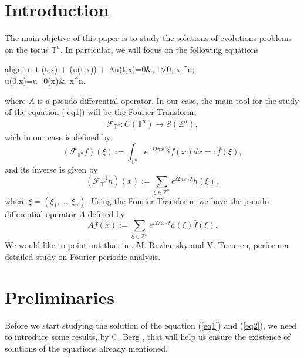 \documentclass[11pt]{article}
\begin{document}
	\section{Introduction}
	The main objetive of this paper is to study the solutions of evolutions problems on the torus $\mathbb{T}^n$. In particular, we will focus on the following equations
	\begin{empheq}[left = \empheqlbrace]{align}\label{eq1}
		u_t (t,x) + (u(t,x)) + Au(t,x)=0&, \hspace{11pt}t>0, \hspace{5pt}x \in {}^n;\\
		u(0,x)=u_0(x)&, \hspace{10pt}x\in {}^n.\notag
	\end{empheq}
where $A$ is a pseudo-differential operator. In our case, the main tool for the study of the equation (\ref{eq1}) will be the Fourier Transform,
\begin{align*}
	\mathcal{F}_{\mathbb{T}^n}:C(\mathbb{T}^n) \rightarrow \mathcal{S}(\mathbb{Z}^n),
\end{align*}
wich in our case is defined by
\begin{equation*}
	\left(\mathcal{F}_{\mathbb{T}^n} f\right)(\xi) := \int_{\mathbb{T}^n} e^{-i2\pi x\cdot\xi}f(x) dx =:\hat{f}(\xi),
\end{equation*}
and its inverse is given by
\begin{equation*}
	\left(\mathcal{F}_{\mathbb{T}^n}^{-1}h\right)(x) := \sum_{\xi \in \mathbb{Z}^n}e^{i2\pi x\cdot\xi}h(\xi),
\end{equation*}
where $\xi=(\xi_1,\dots,\xi_n)$. Using the Fourier Transform, we have the pseudo-differential operator $A$ defined by
\begin{equation*}
	Af(x) := \sum_{\xi \in \mathbb{Z}^n} e^{i2\pi x\cdot \xi} a(\xi)\hat{f}(\xi).
\end{equation*}
We would like to point out that in \cite{ruzhansky}, M. Ruzhansky and V. Turunen, perform a detailed study on Fourier periodic analysis.
\section{Preliminaries}
Before we start studying the solution of the equation (\ref{eq1}) and (\ref{eq2}), we need to introduce some results, by C. Berg \cite{Berg1976PotentialTO}, that will help us ensure the existence of solutions of the equations already mentioned.
\end{document}
